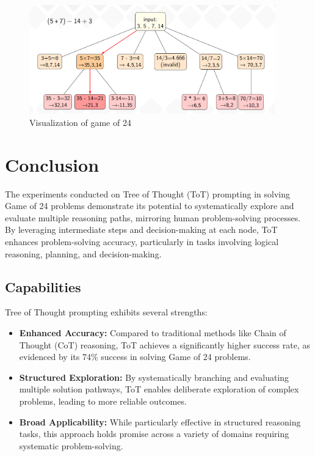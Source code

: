 \documentclass[12pt, a4paper]{article}
\begin{document}
\begin{figure}[h!]
    \centering
    \includegraphics[width=0.95\textwidth]{game24_example.png} 
    \caption{Visualization of game of 24}
    \label{fig:example}
\end{figure}
\pagebreak

\section{Conclusion}
The experiments conducted on Tree of Thought (ToT) prompting in solving Game of 24 problems demonstrate its potential to systematically explore and evaluate multiple reasoning paths, mirroring human problem-solving processes. By leveraging intermediate steps and decision-making at each node, ToT enhances problem-solving accuracy, particularly in tasks involving logical reasoning, planning, and decision-making.

\subsection{Capabilities}
Tree of Thought prompting exhibits several strengths:
\begin{itemize}
\item \textbf{Enhanced Accuracy:} Compared to traditional methods like Chain of Thought (CoT) reasoning, ToT achieves a significantly higher success rate, as evidenced by its 74\% success in solving Game of 24 problems.
\item \textbf{Structured Exploration:} By systematically branching and evaluating multiple solution pathways, ToT enables deliberate exploration of complex problems, leading to more reliable outcomes.
\item \textbf{Broad Applicability:} While particularly effective in structured reasoning tasks, this approach holds promise across a variety of domains requiring systematic problem-solving.
\end{itemize}
\end{document}
